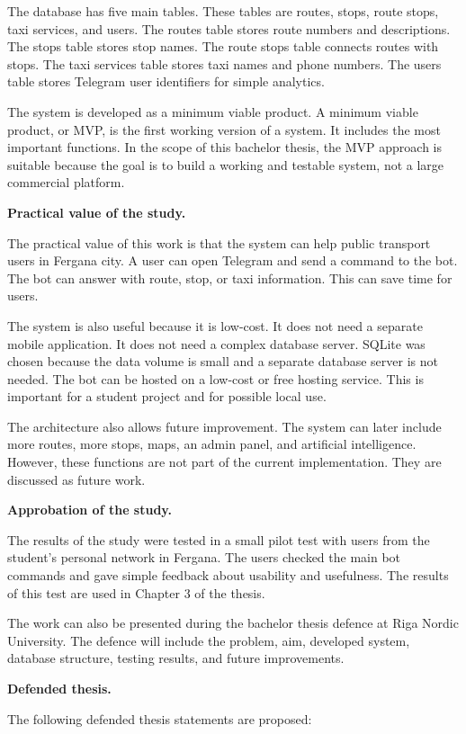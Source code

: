 The database has five main tables. These tables are routes, stops, route stops, taxi services, and users. The routes table stores route numbers and descriptions. The stops table stores stop names. The route stops table connects routes with stops. The taxi services table stores taxi names and phone numbers. The users table stores Telegram user identifiers for simple analytics.

The system is developed as a minimum viable product. A minimum viable product, or MVP, is the first working version of a system. It includes the most important functions. In the scope of this bachelor thesis, the MVP approach is suitable because the goal is to build a working and testable system, not a large commercial platform.

\textbf{Practical value of the study.}

The practical value of this work is that the system can help public transport users in Fergana city. A user can open Telegram and send a command to the bot. The bot can answer with route, stop, or taxi information. This can save time for users.

The system is also useful because it is low-cost. It does not need a separate mobile application. It does not need a complex database server. SQLite was chosen because the data volume is small and a separate database server is not needed. The bot can be hosted on a low-cost or free hosting service. This is important for a student project and for possible local use.

The architecture also allows future improvement. The system can later include more routes, more stops, maps, an admin panel, and artificial intelligence. However, these functions are not part of the current implementation. They are discussed as future work.

\textbf{Approbation of the study.}

The results of the study were tested in a small pilot test with users from the student's personal network in Fergana. The users checked the main bot commands and gave simple feedback about usability and usefulness. The results of this test are used in Chapter 3 of the thesis.

The work can also be presented during the bachelor thesis defence at Riga Nordic University. The defence will include the problem, aim, developed system, database structure, testing results, and future improvements.

\textbf{Defended thesis.}

The following defended thesis statements are proposed:

